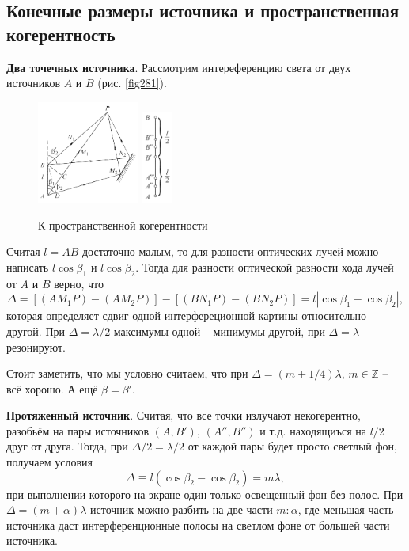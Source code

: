 \subsection{Конечные размеры источника и пространственная когерентность}


\textbf{Два точечных источника}.
Рассмотрим интереференцию света от двух источников $A$ и $B$ (рис. \eqref{fig281}). 
\begin{figure}[ht]
    \centering
    \includegraphics[width=0.3\textwidth]{figures/28_1.png}
    \hspace{5 mm} 
    \includegraphics[width=0.09\textwidth]{figures/28_2.png}
    \caption{К пространственной когерентности}
    \label{fig281}
\end{figure}
Считая $l=AB$ достаточно малым, то для разности оптических лучей можно написать $l\cos \beta_1$ и $l \cos \beta_2$. Тогда для разности оптической разности хода лучей от $A$ и $B$ верно, что
\begin{equation*}
    \Delta = 
    \left[(AM_1P)-(AM_2P)\right]-\left[(BN_1 P) - (BN_2P)\right]
   = l |\cos \beta_1 - \cos \beta_2|,
\end{equation*}
которая определяет сдвиг одной интерфереционной картины относительно другой. При $\Delta = \lambda/2$ максимумы одной -- минимумы другой, при $\Delta = \lambda$ резонируют. 

Стоит заметить, что мы условно считаем, что при $\Delta = (m+1/4)\lambda,\, m \in \mathbb{Z}$ -- всё хорошо. А ещё $\beta = \beta'$. 



\textbf{Протяженный источник}.  Считая, что все точки излучают некогерентно, разобьём на пары источников $(A, B'),\,  (A'', B'')$ и т.д. находящиъся на $l/2$ друг от друга. Тогда, при $\Delta/2 = \lambda/2$ от каждой пары будет просто светлый фон, получаем условия
\begin{equation*}
    \Delta \equiv l(\cos \beta_2 - \cos \beta_2) = m\lambda,
\end{equation*}
при выполнении которого на экране один только освещенный фон без полос. При $\Delta = (m+\alpha)\lambda$ источник можно разбить на две части $m \colon  \alpha$, где меньшая часть источника даст интерференционные полосы на светлом фоне от большей части источника. 

